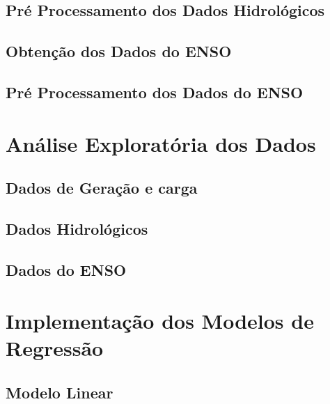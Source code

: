 \subsection{Pré Processamento dos Dados Hidrológicos} %

\subsection{Obtenção dos Dados do ENSO} %

\subsection{Pré Processamento dos Dados do ENSO} %


\section{Análise Exploratória dos Dados} %

\subsection{Dados de Geração e carga} %

\subsection{Dados Hidrológicos} %

\subsection{Dados do ENSO} %


\section{Implementação dos Modelos de Regressão} %

\subsection{Modelo Linear} %

